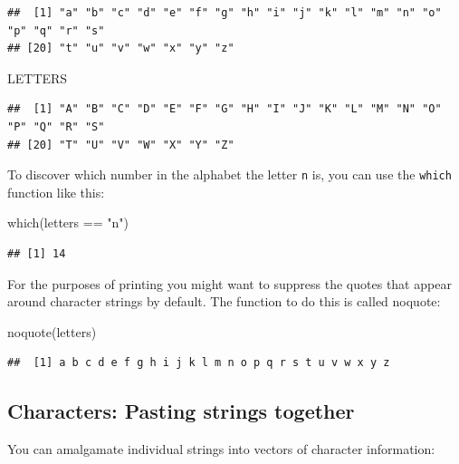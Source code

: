 \documentclass[
]{book}
\newenvironment{Shaded}{\begin{snugshade}}{\end{snugshade}}
\newcommand{\FunctionTok}[1]{\textcolor[rgb]{0.00,0.00,0.00}{#1}}
\newcommand{\NormalTok}[1]{#1}
\newcommand{\SpecialCharTok}[1]{\textcolor[rgb]{0.00,0.00,0.00}{#1}}
\newcommand{\StringTok}[1]{\textcolor[rgb]{0.31,0.60,0.02}{#1}}
\begin{document}
\begin{verbatim}
##  [1] "a" "b" "c" "d" "e" "f" "g" "h" "i" "j" "k" "l" "m" "n" "o" "p" "q" "r" "s"
## [20] "t" "u" "v" "w" "x" "y" "z"
\end{verbatim}

\begin{Shaded}
\begin{Highlighting}[]
\NormalTok{LETTERS}
\end{Highlighting}
\end{Shaded}

\begin{verbatim}
##  [1] "A" "B" "C" "D" "E" "F" "G" "H" "I" "J" "K" "L" "M" "N" "O" "P" "Q" "R" "S"
## [20] "T" "U" "V" "W" "X" "Y" "Z"
\end{verbatim}

To discover which number in the alphabet the letter \texttt{n} is, you can use the \texttt{which} function like this:

\begin{Shaded}
\begin{Highlighting}[]
\FunctionTok{which}\NormalTok{(letters }\SpecialCharTok{==} \StringTok{"n"}\NormalTok{)}
\end{Highlighting}
\end{Shaded}

\begin{verbatim}
## [1] 14
\end{verbatim}

For the purposes of printing you might want to suppress the quotes that appear around character strings by default. The function to do this is called noquote:

\begin{Shaded}
\begin{Highlighting}[]
\FunctionTok{noquote}\NormalTok{(letters)}
\end{Highlighting}
\end{Shaded}

\begin{verbatim}
##  [1] a b c d e f g h i j k l m n o p q r s t u v w x y z
\end{verbatim}

\hypertarget{characters-pasting-strings-together}{%
\subsection{Characters: Pasting strings together}\label{characters-pasting-strings-together}}

You can amalgamate individual strings into vectors of character information:
\end{document}
